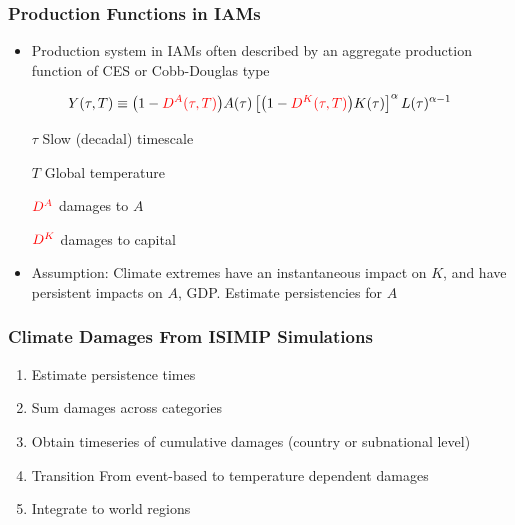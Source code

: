 \documentclass[
c,
11pt,
aspectratio=169, %
final,
]{beamer}
\begin{document}
\begin{frame}
  \frametitle{Production Functions in IAMs}
  \begin{itemize}
  \item  Production system in IAMs often described by an aggregate production function of CES or Cobb-Douglas type
  \end{itemize}
  \vfill
  \begin{equation*}
    \label{eq:CD}
    Y(\tau,T)\equiv \big(1-\tc{red}{\DA(\tau,T)}\big)A(\tau)\left[\big(1-\tc{red}{\DK(\tau,T)}\big)K(\tau) \right]^\alpha L(\tau)^{\alpha-1}
  \end{equation*}
  \vfill
  \begin{minipage}[l]{.45\linewidth}
   \begin{itemize} 
   \item [$\tau$] Slow (decadal) timescale
   \item [$T$] Global temperature
   \end{itemize}
\end{minipage}\hfill
\begin{minipage}[l]{.45\linewidth}
  \begin{itemize}
  \item [$\tc{red}{\DA}$]  damages to $A$ 
   \item [$\tc{red}{\DK}$]  damages to capital
   \end{itemize}
 \end{minipage}
 
 \vfill
 \begin{itemize}
 \item Assumption: Climate extremes have an instantaneous impact on $K$, and have persistent impacts on $A$, GDP.
   \arrowitem Estimate persistencies for $A$
   \end{itemize}
\end{frame}


\begin{frame}
  \frametitle{Climate Damages From ISIMIP Simulations}
  \begin{enumerate}
  \item Estimate persistence times
  \item Sum damages across categories
  \item Obtain timeseries of cumulative damages (country or subnational level)
  \item Transition From event-based to temperature dependent damages
  \item Integrate to world regions  
  \end{enumerate}
\end{frame}
\end{document}
